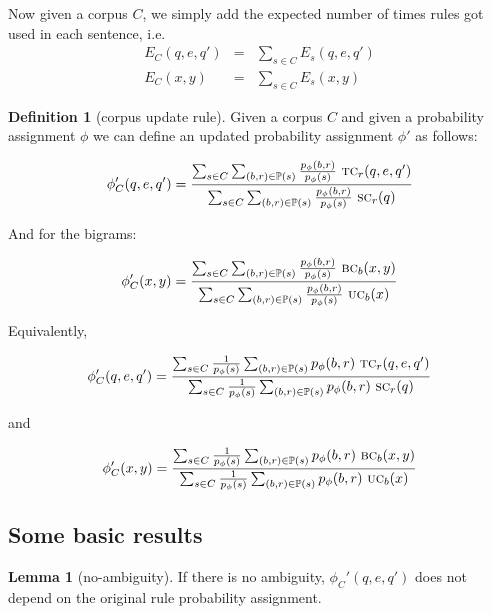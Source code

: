 \documentclass[12pt]{article}
\theoremstyle{definition}
\newtheorem{definition}{Definition}[section]
\newtheorem{lemma}{Lemma}[section]
\begin{document}
Now given a corpus $C$, we simply add the expected number of times rules got used in each sentence, i.e.
\begin{eqnarray*}
  E_C(q,e,q')& = &\sum_{s\in C}E_s(q,e,q')\\
  E_C(x,y)& = &\sum_{s\in C}E_s(x,y)
\end{eqnarray*}



\begin{definition}[corpus update rule]
  Given a corpus $C$ and given a probability assignment $\phi$ we can define an updated probability assignment $\phi'$ as follows:

  $$\phi_C'(q,e,q') = \frac{\sum_{s\in C}\sum_{(b,r)\in\mathbb{P}(s)} \frac{p_\phi(b,r)}{p_\phi(s)}~ \text{\textsc{tc}}_r(q,e,q')}{\sum_{s\in C}\sum_{(b,r)\in\mathbb{P}(s)} \frac{p_\phi(b,r)}{p_\phi(s)}~ \text{\textsc{sc}}_r(q)}$$ 

And for the bigrams:

  $$\phi_C'(x,y) = \frac{\sum_{s\in C}\sum_{(b,r)\in\mathbb{P}(s)} \frac{p_\phi(b,r)}{p_\phi(s)}~ \text{\textsc{bc}}_b(x,y)}{\sum_{s\in C}\sum_{(b,r)\in\mathbb{P}(s)} \frac{p_\phi(b,r)}{p_\phi(s)}~ \text{\textsc{uc}}_b(x)}$$ 

\end{definition}


Equivalently,

$$\phi_C'(q,e,q') = \frac{\sum_{s\in C}\frac{1}{p_\phi(s)}\sum_{(b,r)\in\mathbb{P}(s)} p_\phi(b,r)~ \text{\textsc{tc}}_r(q,e,q')}{\sum_{s\in C}\frac{1}{p_\phi(s)}\sum_{(b,r)\in\mathbb{P}(s)} p_\phi(b,r)~ \text{\textsc{sc}}_r(q)}$$ 

and 

$$\phi_C'(x,y) = \frac{\sum_{s\in C}\frac{1}{p_\phi(s)}\sum_{(b,r)\in\mathbb{P}(s)} p_\phi(b,r)~ \text{\textsc{bc}}_b(x,y)}{\sum_{s\in C}\frac{1}{p_\phi(s)}\sum_{(b,r)\in\mathbb{P}(s)} p_\phi(b,r)~ \text{\textsc{uc}}_b(x)}$$ 





\subsection{Some basic results}

\begin{lemma}[no-ambiguity]
  If there is no ambiguity, $\phi_C'(q,e,q')$ does not depend on the original rule probability assignment.
\end{lemma}
\end{document}
